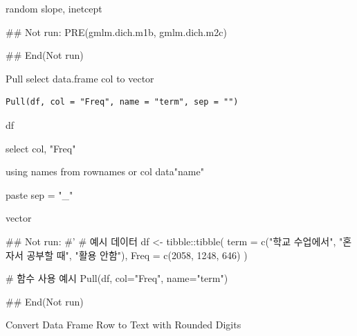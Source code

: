 \documentclass[a4paper]{book}
\begin{document}
%
\begin{Value}
random slope, inetcept
\end{Value}
%
\begin{Examples}
\begin{ExampleCode}
## Not run: 
 PRE(gmlm.dich.m1b, gmlm.dich.m2c)

## End(Not run)
\end{ExampleCode}
\end{Examples}
%
\begin{Description}
Pull select data.frame col to vector
\end{Description}
%
\begin{Usage}
\begin{verbatim}
Pull(df, col = "Freq", name = "term", sep = "")
\end{verbatim}
\end{Usage}
%
\begin{Arguments}
\begin{ldescription}
\item[\code{df}] df

\item[\code{col}] select col, "Freq"

\item[\code{name}] using names from rownames or col data"name"

\item[\code{sep}] paste sep = "\_"
\end{ldescription}
\end{Arguments}
%
\begin{Value}
vector
\end{Value}
%
\begin{Examples}
\begin{ExampleCode}

## Not run: 
#'
# 예시 데이터
df <- tibble::tibble(
  term = c("학교 수업에서", "혼자서 공부할 때", "활용 안함"),
  Freq = c(2058, 1248, 646)
)

# 함수 사용 예시
Pull(df, col="Freq", name="term")

## End(Not run)

\end{ExampleCode}
\end{Examples}
%
\begin{Description}
Convert Data Frame Row to Text with Rounded Digits
\end{Description}
\end{document}
